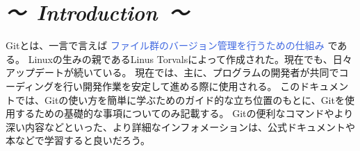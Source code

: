 \documentclass[10pt,a4j,openany,dvipdfmx]{jsarticle}
\begin{document}
\section*{\it {～\ Introduction\ ～}}





Gitとは、一言で言えば\textcolor{RoyalBlue}{ ファイル群のバージョン管理を行うための仕組み }である。
Linuxの生みの親であるLinus Torvalsによって作成された。現在でも、日々アップデートが続いている。
現在では、主に、プログラムの開発者が共同でコーディングを行い開発作業を安定して進める際に使用される。
このドキュメントでは、Gitの使い方を簡単に学ぶためのガイド的な立ち位置のもとに、Gitを使用するための基礎的な事項についてのみ記載する。
Gitの便利なコマンドやより深い内容などといった、より詳細なインフォメーションは、公式ドキュメントや本などで学習すると良いだろう。


\end{document}
